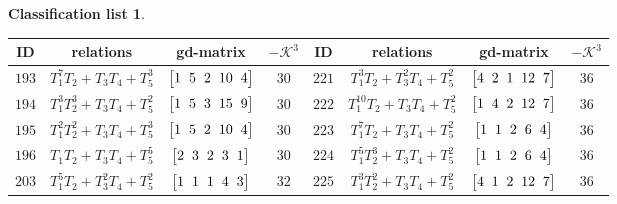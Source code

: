\documentclass[pdftex]{sigma}%
\theoremstyle{definition}
\newtheorem{class-list}[thm]{Classification list}
\numberwithin{equation}{section}
\begin{document}
\begin{class-list}
\begin{table}[t!]\centering\setlength{\tabcolsep}{2.5pt}
\renewcommand{\arraystretch}{1.25}\small\tabulinesep=1mm
\begin{tabu}{c|c|c|c||c|c|c|c}
\hline
ID&relations&gd-matrix&$-\mathcal{K}^3$&ID&relations&gd-matrix&$-\mathcal{K}^3$
\\ \hline
${193}$&${T_{1}^{7}T_{2}+T_{3}T_{4}+T_{5}^{3}}$
&$\arraycolsep=1mm\begin{bmatrix}{1} & {5} & {2} & {10} & {4}\end{bmatrix}$&${30}$
&${221}$&${T_{1}^{3}T_{2}+T_{3}^{2}T_{4}+T_{5}^{2}}$
&$\arraycolsep=1mm\begin{bmatrix}{4} & {2} & {1} & {12} & {7}\end{bmatrix}$&${36}$
\\ \hline
${194}$&${T_{1}^{3}T_{2}^{3}+T_{3}T_{4}+T_{5}^{2}}$
&$\arraycolsep=1mm\begin{bmatrix}{1} & {5} & {3} & {15} & {9}\end{bmatrix}$&${30}$
&${222}$&${T_{1}^{10}T_{2}+T_{3}T_{4}+T_{5}^{2}}$
&$\arraycolsep=1mm\begin{bmatrix}{1} & {4} & {2} & {12} & {7}\end{bmatrix}$&${36}$
\\ \hline
${195}$&${T_{1}^{2}T_{2}^{2}+T_{3}T_{4}+T_{5}^{3}}$
&$\arraycolsep=1mm\begin{bmatrix}{1} & {5} & {2} & {10} & {4}\end{bmatrix}$&${30}$
&${223}$&${T_{1}^{7}T_{2}+T_{3}T_{4}+T_{5}^{2}}$
&$\arraycolsep=1mm\begin{bmatrix}{1} & {1} & {2} & {6} & {4}\end{bmatrix}$&${36}$
\\ \hline
${196}$&${T_{1}T_{2}+T_{3}T_{4}+T_{5}^{5}}$
&$\arraycolsep=1mm\begin{bmatrix}{2} & {3} & {2} & {3} & {1}\end{bmatrix}$&${30}$
&${224}$&${T_{1}^{5}T_{2}^{3}+T_{3}T_{4}+T_{5}^{2}}$
&$\arraycolsep=1mm\begin{bmatrix}{1} & {1} & {2} & {6} & {4}\end{bmatrix}$&${36}$
\\ \hline
${203}$&${T_{1}^{5}T_{2}+T_{3}^{2}T_{4}+T_{5}^{2}}$
&$\arraycolsep=1mm\begin{bmatrix}{1} & {1} & {1} & {4} & {3}\end{bmatrix}$&${32}$
&${225}$&${T_{1}^{3}T_{2}^{2}+T_{3}T_{4}+T_{5}^{2}}$
&$\arraycolsep=1mm\begin{bmatrix}{4} & {1} & {2} & {12} & {7}\end{bmatrix}$&${36}$

\end{tabu}
\end{table}
\end{class-list}
\end{document}
